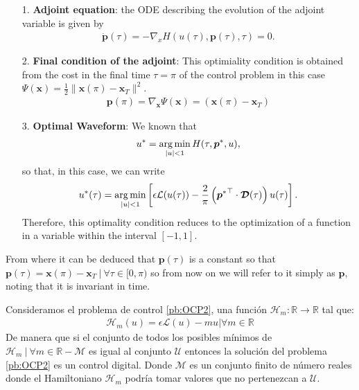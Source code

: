 \begin{itemize}
    \item[1.] \textbf{Adjoint equation}: the ODE describing the evolution of the adjoint variable is given by 
    \begin{gather}
    	\dot{\bm{p}}(\tau) = -\nabla_x H(u(\tau),\bm{p}(\tau),\tau) = 0.
    \end{gather}
    
	\item[2.] \textbf{Final condition of the adjoint}: This optimiality condition is obtained from the cost in the final time $\tau = \pi$ of the control problem in this case $ \Psi (\bm{x}) = \frac {1}{2} \| \bm{x} (\pi) - \bm{x}_T \|^2 $.
    \begin{gather}
    	\bm{p}(\pi) = \nabla_{\bm{x}} \Psi(\bm{x}) =  (\bm{x} (\pi) - \bm{x}_T)
    \end{gather} 
    
    \item[3.] \textbf{Optimal  Waveform}: We known that 
    \begin{align*}
    	u^* = \operatorname*{arg\,min}_{|u|<1} H(\tau,\bm{p}^*,u),
    \end{align*}
	so that, in this case, we can write
    \begin{gather}
        u^*(\tau) = \operatorname*{arg\,min}_{|u|<1}  \left[\epsilon \mathcal{L}(u(\tau)) - \frac 2\pi \left({\bm{p}^*}^\top \cdot \bm{\mathcal{D}}(\tau)\right) u(\tau) \right].
    \end{gather}
    Therefore, this optimality condition reduces to the optimization of a function in a variable within the interval $ [- 1,1] $. 
\end{itemize}

From where it can be deduced that $ \bm {p} (\tau)$ is a constant so that $ \bm {p} (\tau) = \bm {x} (\pi) - \bm { x} _T \ | \ \forall \tau \in [0, \pi) $ so from now on we will refer to it simply as $ \bm {p} $, noting that it is invariant in time.
\newline

%
\begin{proposition}
    Consideramos el problema de control \ref{pb:OCP2}, una función $\mathcal{H}_m:\mathbb{R}\rightarrow \mathbb{R}$ tal que:
    \begin{gather}\label{Hm}
        \mathcal{H}_m(u) = \epsilon \mathcal{L}(u) - mu  |  \forall m \in \mathbb{R}
    \end{gather}
    De manera que si el conjunto de todos los posibles mínimos de $\mathcal{H}_m \ | \ \forall m \in \mathbb{R} - \mathcal{M}$  es igual al conjunto $\mathcal{U}$ entonces la solución del problema \ref{pb:OCP2} es un control digital. Donde $\mathcal{M}$ es un conjunto finito de número reales donde el Hamiltoniano $\mathcal{H}_m$ podría tomar valores que no pertenezcan a $\mathcal{U}$.
\end{proposition}

